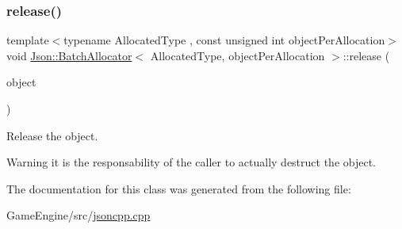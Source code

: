 \subsubsection{\texorpdfstring{release()}{release()}}
{\footnotesize\ttfamily template$<$typename Allocated\+Type , const unsigned int object\+Per\+Allocation$>$ \\
void \mbox{\hyperlink{class_json_1_1_batch_allocator}{Json\+::\+Batch\+Allocator}}$<$ Allocated\+Type, object\+Per\+Allocation $>$\+::release (\begin{DoxyParamCaption}\item[{Allocated\+Type $\ast$}]{object }\end{DoxyParamCaption})\hspace{0.3cm}{\ttfamily [inline]}}

Release the object. \begin{DoxyWarning}{Warning}
it is the responsability of the caller to actually destruct the object. 
\end{DoxyWarning}


The documentation for this class was generated from the following file\+:\begin{DoxyCompactItemize}
\item 
Game\+Engine/src/\mbox{\hyperlink{jsoncpp_8cpp}{jsoncpp.\+cpp}}\end{DoxyCompactItemize}
